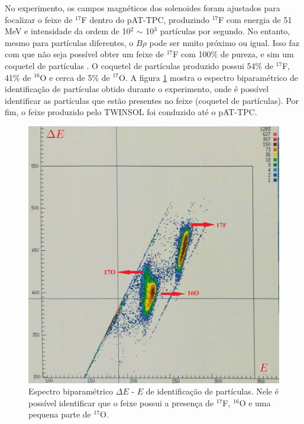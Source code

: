 \documentclass[a4paper,12pt,oneside]{book}
\begin{document}

\par No experimento, os campos magnéticos dos solenoides foram ajustados para focalizar o feixe de $^{17}$F dentro do pAT-TPC, produzindo $^{17}$F com energia de 51 MeV e intensidade da ordem de 10$^2$ $\sim$ 10$^3$ partículas por segundo. No entanto, mesmo para partículas diferentes, o $B\rho$ pode ser muito próximo ou igual. Isso faz com que não seja possível obter um feixe de $^{17}$F com 100\% de pureza, e sim um coquetel de partículas \cite{zamora_mater}. O coquetel de partículas produzido possui 54\% de $^{17}$F, 41\% de $^{16}$O e cerca de 5\% de $^{17}$O. A figura \ref{fig:PID_17F} mostra o espectro biparamétrico de identificação de partículas obtido durante o experimento, onde é possível identificar as partículas que estão presentes no feixe (coquetel de partículas). Por fim, o feixe produzido pelo TWINSOL foi conduzido até o pAT-TPC.

\begin{figure}[H]
    \centering
    \includegraphics[scale = 0.12]{figs/pid_17F.png}
    \caption{Espectro biparamétrico $\Delta E$ - $E$ de identificação de partículas. Nele é possível identificar que o feixe possui a presença de $^{17}$F, $^{16}$O e uma pequena parte de $^{17}$O.}
    \label{fig:PID_17F}
\end{figure}
\end{document}
